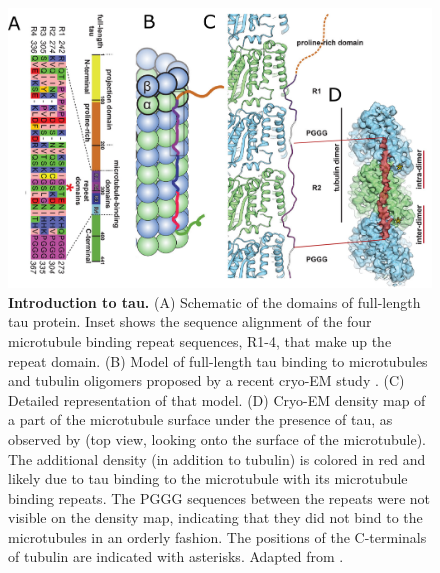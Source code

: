 \begin{figure}[h!tb]
\centering
\includegraphics[width=\linewidth]{Figures/tau.png}
\caption[Introduction to tau.]{\textbf{Introduction to tau.}
(A) Schematic of the domains of full-length tau protein. Inset shows the sequence alignment of the four microtubule binding repeat sequences, R1-4, that make up the repeat domain. (B) Model of full-length tau binding to microtubules and tubulin oligomers proposed by a recent cryo-EM study \parencite{Kellogg2018}. (C) Detailed representation of that model. (D) Cryo-EM density map of a part of the microtubule surface under the presence of tau, as observed by \cite{Kellogg2018} (top view, looking onto the surface of the microtubule). The additional density (in addition to tubulin) is colored in red and likely due to tau binding to the microtubule with its microtubule binding repeats. The PGGG sequences between the repeats were not visible on the density map, indicating that they did not bind to the microtubules in an orderly fashion. The positions of the C-terminals of tubulin are indicated with asterisks. Adapted from \cite{Kellogg2018}. 
	}\label{tau}
\end{figure}

